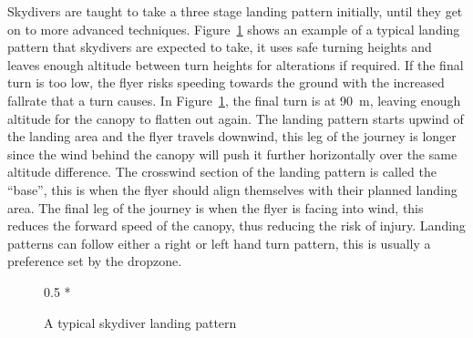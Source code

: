 Skydivers are taught to take a three stage landing pattern initially, until they get on to more advanced techniques. Figure~\ref{fig:landing-pattern} shows an example of a typical landing pattern that skydivers are expected to take, it uses safe turning heights and leaves enough altitude between turn heights for alterations if required. If the final turn is too low, the flyer risks speeding towards the ground with the increased fallrate that a turn causes. In Figure~\ref{fig:landing-pattern}, the final turn is at \SI{90}{\metre}, leaving enough altitude for the canopy to flatten out again. The landing pattern starts upwind of the landing area and the flyer travels downwind, this leg of the journey is longer since the wind behind the canopy will push it further horizontally over the same altitude difference. The crosswind section of the landing pattern is called the ``base'', this is when the flyer should align themselves with their planned landing area. The final leg of the journey is when the flyer is facing into wind, this reduces the forward speed of the canopy, thus reducing the risk of injury. Landing patterns can follow either a right or left hand turn pattern, this is usually a preference set by the dropzone.

\begin{figure}[ht]
  \centering
  \begin{scaletikzpicturetowidth}{0.5 * \linewidth}
  \end{scaletikzpicturetowidth}
  \caption{A typical skydiver landing pattern}\label{fig:landing-pattern}
\end{figure}
